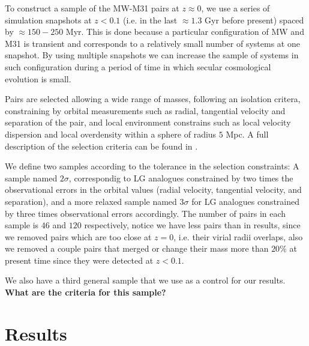 \documentclass{emulateapj}
\newcommand{\mpc}{\rm{Mpc}}
\begin{document}
To construct a sample of the MW-M31 pairs at $z\approx 0$, we use a
series of simulation snapshots  at $z<0.1$ (i.e. in the last $\approx
1.3$ Gyr before present) spaced by $\approx 150-250$ Myr. This is done
because a particular configuration of MW and M31 is transient and
corresponds to a relatively small number of systems at one
snapshot. By using multiple snapshots we can increase the sample of
systems in such configuration during a period of time in which secular
cosmological evolution is small. 

Pairs are selected allowing a wide range of masses, following an
isolation critera, constraining by orbital measurements such as
radial, tangential velocity and separation of the pair, and local
environment constrains such as local velocity dispersion and local
overdensity within a sphere of radius $5$ \mpc. A full description of
the selection criteria can be found in \citet{lganalogues,sat}. 

We define two samples according to the tolerance in the selection constraints:
A sample named $2\sigma$, correspondig to LG analogues constrained by
two times the observational errors in the orbital values (radial
velocity, tangential velocity, and separation), and a more relaxed
sample named $3\sigma$ for LG analogues constrained by three times
observational errors accordingly. The number of pairs in each sample
is $46$ and $120$ respectively, notice we have less pairs than in
\citet{lganalogues} results, since we removed pairs which are too
close at $z=0$, i.e. their virial radii overlaps, also we removed a
couple pairs that merged or change their mass more than $20\%$ at
present time since they were detected at $z<0.1$.  

We also have a third general sample that we use as a control for our
results. {\bf What are the criteria for this sample?}

\section{Results}
\label{sec:results}
\end{document}
